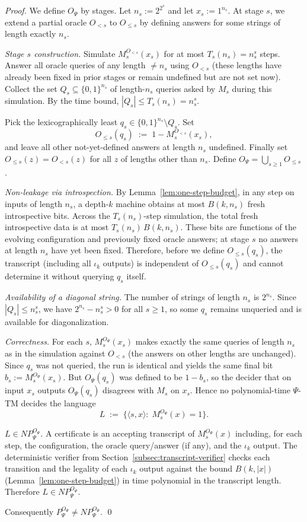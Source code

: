 \documentclass[11pt]{article}
\theoremstyle{plain}
\theoremstyle{definition}
\newcommand{\PSi}{\Psi}
\newcommand{\bits}{\{0,1\}}
\newcommand{\len}[1]{\left|#1\right|}
\begin{document}
\begin{proof}
We define $O_\PSi$ by stages. Let $n_s:=2^{2^{s}}$ and let $x_s:=1^{n_s}$. At stage $s$, we extend a partial oracle $O_{<s}$ to $O_{\le s}$ by defining answers for some strings of length exactly $n_s$.

\emph{Stage $s$ construction.} Simulate $M_s^{O_{<s}}(x_s)$ for at most $T_s(n_s)=n_s^{s}$ steps. Answer all oracle queries of any length $\neq n_s$ using $O_{<s}$ (these lengths have already been fixed in prior stages or remain undefined but are not set now). Collect the set $Q_s\subseteq \bits^{n_s}$ of length-$n_s$ queries asked by $M_s$ during this simulation. By the time bound, $|Q_s|\le T_s(n_s)=n_s^{s}$.

Pick the lexicographically least $q_s\in\bits^{n_s}\setminus Q_s$. Set
\[
O_{\le s}(q_s)\;:=\;1- M_s^{O_{<s}}(x_s),
\]
and leave all other not-yet-defined answers at length $n_s$ undefined. Finally set $O_{\le s}(z)=O_{<s}(z)$ for all $z$ of lengths other than $n_s$. Define $O_\PSi=\bigcup_{s\ge1} O_{\le s}$.

\emph{Non-leakage via introspection.} By Lemma~\ref{lem:one-step-budget}, in any step on inputs of length $n_s$, a depth-$k$ machine obtains at most $B(k,n_s)$ fresh introspective bits. Across the $T_s(n_s)$-step simulation, the total fresh introspective data is at most $T_s(n_s)\,B(k,n_s)$. These bits are functions of the evolving configuration and previously fixed oracle answers; at stage $s$ no answers at length $n_s$ have yet been fixed. Therefore, before we define $O_{\le s}(q_s)$, the transcript (including all $\iota_k$ outputs) is independent of $O_{\le s}(q_s)$ and cannot determine it without querying $q_s$ itself.

\emph{Availability of a diagonal string.} The number of strings of length $n_s$ is $2^{n_s}$. Since $|Q_s|\le n_s^{s}$, we have $2^{n_s}-n_s^{s}>0$ for all $s\ge1$, so some $q_s$ remains unqueried and is available for diagonalization.

\emph{Correctness.} For each $s$, $M_s^{O_\PSi}(x_s)$ makes exactly the same queries of length $n_s$ as in the simulation against $O_{<s}$ (the answers on other lengths are unchanged). Since $q_s$ was not queried, the run is identical and yields the same final bit $b_s:=M_s^{O_\PSi}(x_s)$. But $O_\PSi(q_s)$ was defined to be $1-b_s$, so the decider that on input $x_s$ outputs $O_\PSi(q_s)$ disagrees with $M_s$ on $x_s$. Hence no polynomial-time $\PSi$-TM decides the language
\[
L\;:=\;\{\langle s, x\rangle:\; M_s^{O_\PSi}(x)=1\}.
\]

\emph{$L\in NP^{O_\PSi}_\PSi$.} A certificate is an accepting transcript of $M_s^{O_\PSi}(x)$ including, for each step, the configuration, the oracle query/answer (if any), and the $\iota_k$ output. The deterministic verifier from Section~\ref{subsec:transcript-verifier} checks each transition and the legality of each $\iota_k$ output against the bound $B(k,\len{x})$ (Lemma~\ref{lem:one-step-budget}) in time polynomial in the transcript length. Therefore $L\in NP^{O_\PSi}_\PSi$.

Consequently $P^{O_\PSi}_\PSi \neq NP^{O_\PSi}_\PSi$. \qed
\end{proof}
\end{document}
